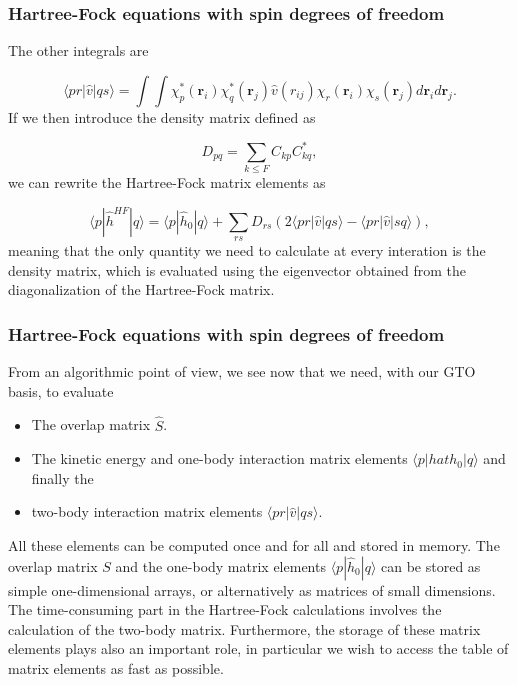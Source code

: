 \documentclass{beamer}
\begin{document}
\begin{frame}
\frametitle{Hartree-Fock equations with spin degrees of freedom}

\begin{block}{}

The other integrals are

\begin{equation*}
\langle pr | \hat{v}|qs\rangle = \int\int \chi_{p}^*(\mathbf{r}_i)\chi_{q}^*(\mathbf{r}_j)\hat{v}(r_{ij})\chi_{r}(\mathbf{r}_i)\chi_{s}(\mathbf{r}_j)
  d\mathbf{r}_id\mathbf{r}_j.
\end{equation*}
If we then introduce the density matrix defined as

\begin{equation*}
D_{pq}=\sum_{k\le F}C_{kp}C_{kq}^*,
\end{equation*}
we can rewrite the Hartree-Fock matrix elements as

\begin{equation*}
\langle p | \hat{h}^{HF} | q \rangle = \langle p|\hat{h}_0|q\rangle +\sum_{rs}D_{rs}\left(2\langle pr | \hat{v}|qs\rangle-\langle pr | \hat{v}|sq\rangle\right),
\end{equation*}
meaning that the only quantity we need to calculate at every
interation is the density matrix, which is evaluated using the eigenvector 
obtained from the diagonalization of the Hartree-Fock matrix.
\end{block}
\end{frame}

\begin{frame}
\frametitle{Hartree-Fock equations with spin degrees of freedom}

\begin{block}{}

From an algorithmic point of view, we see now that we need, with our GTO basis, to evaluate 

\begin{itemize}
  \item The overlap matrix $\hat{S}$.

  \item The kinetic energy and one-body interaction matrix elements $\langle p|hat{h}_0|q\rangle $ and finally the

  \item two-body interaction matrix elements $\langle pr | \hat{v}|qs\rangle$.
\end{itemize}

\noindent
All these elements can be computed once and for all and stored in
memory. The overlap matrix $S$ and the one-body matrix elements
$\langle p|\hat{h}_0|q\rangle $ can be stored as simple
one-dimensional arrays, or alternatively as matrices of small
dimensions.  The time-consuming part in the Hartree-Fock calculations
involves the calculation of the two-body matrix. Furthermore, the
storage of these matrix elements plays also an important role, in
particular we wish to access the table of matrix elements as fast as
possible.  
\end{block}
\end{frame}
\end{document}
